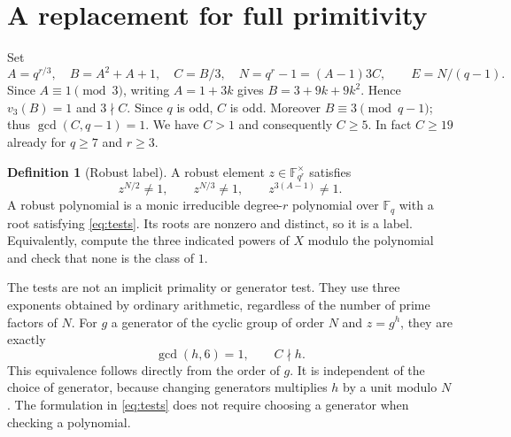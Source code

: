 \documentclass[11pt]{article}
\theoremstyle{definition}\newtheorem{definition}[theorem]{Definition}
\newcommand{\F}{\mathbb F}\newcommand{\ord}{\operatorname{ord}}\newcommand{\Nrm}{\operatorname{N}}\newcommand{\vpp}{v_p}
\begin{document}
\section{A replacement for full primitivity}
Set
\[
 A=q^{r/3},\quad B=A^2+A+1,\quad C=B/3,\quad N=q^r-1=(A-1)3C,
 \qquad E=N/(q-1).
\]
Since $A\equiv1\pmod3$, writing $A=1+3k$ gives $B=3+9k+9k^2$. Hence $v_3(B)=1$ and $3\nmid C$. Since $q$ is odd, $C$ is odd. Moreover $B\equiv3\pmod{q-1}$; thus $\gcd(C,q-1)=1$. We have $C>1$ and consequently $C\ge5$. In fact $C\ge19$ already for $q\ge7$ and $r\ge3$.

\begin{definition}[Robust label]
A robust element $z\in\F_{q^r}^\times$ satisfies
\begin{equation}\label{eq:tests}
 \boxed{\quad z^{N/2}\ne1,\qquad z^{N/3}\ne1,\qquad z^{3(A-1)}\ne1.\quad}
\end{equation}
A robust polynomial is a monic irreducible degree-$r$ polynomial over $\F_q$ with a root satisfying \eqref{eq:tests}. Its roots are nonzero and distinct, so it is a label. Equivalently, compute the three indicated powers of $X$ modulo the polynomial and check that none is the class of $1$.
\end{definition}

The tests are not an implicit primality or generator test. They use three exponents obtained by ordinary arithmetic, regardless of the number of prime factors of $N$. For $g$ a generator of the cyclic group of order $N$ and $z=g^h$, they are exactly
\begin{equation}\label{eq:hexp}
                 \gcd(h,6)=1,\qquad C\nmid h.
\end{equation}
This equivalence follows directly from the order of $g$. It is independent of the choice of generator, because changing generators multiplies $h$ by a unit modulo $N$. The formulation in \eqref{eq:tests} does not require choosing a generator when checking a polynomial.
\end{document}
